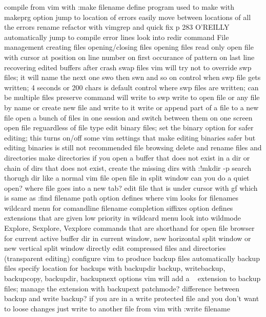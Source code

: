 \documentclass[12pt]{book}
\begin{document}
{{    compile from vim with :make filename
    define program used to make with makeprg option
    jump to location of errors
    easily move between locations of all the errors
  rename refactor with vimgrep and quick fix
    p 283 O'REILLY
  automatically jump to compile error lines
    look into redir command
  File management
    creating files
    opening/closing files
    opening files read only
    open file with cursor at position
      on line number
      on first occurance of pattern
      on last line
    recovering edited buffers after crash
      swap files
      vim will try not to override swp files; it will name the next one swo then swn and so on
      control when swp file gets written; 4 seconds or 200 chars is default
      control where swp files are written; can be multiple files
      preserve command will write to swp
    write to open file or any file by name or create new file and write to it
    write or append part of a file to a new file
    open a bunch of files in one session and switch between them on one screen
    open file reguardless of file type
      edit binary files; set the binary option for safer editing; this turns on/off some vim settings that make editing binaries safer but editing binaries is still not recommended
    file browsing
      delete and rename files and directories
      make directories
        if you open a buffer that does not exist in a dir or chain of dirs that does not exist, create the missing dirs with :!mkdir -p %
      search thorugh dir like a normal vim file
      open file in split window
      can you do a quiet open? where file goes into a new tab?
      edit file that is under cursor with gf which is same as :find filename
        path option defines where vim looks for filenames
      wildcard menu for comandline filename completion
        siffixes option defines extensions that are given low priority in wildcard menu
        look into wildmode
      Explore, Sexplore, Vexplore
        commands that are shorthand for open file browser for current active buffer dir in current window, new horizontal split window or new vertical split window
    directly edit compressed files and directories (transparent editing)
    configure vim to produce backup files
      automatically backup files
      specify location for backups with backupdir
      backup, writebackup, backupcopy, backupdir, backupnext options
      vim will add a ~ extension to backup files; manage the extension with backupext
      patchmode?
      difference between backup and write backup?
      if you are in a write protected file and you don't want to loose changes just write to another file from vim with :write filename
}}
\end{document}
